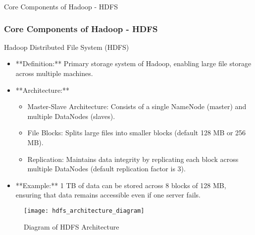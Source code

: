 \documentclass[aspectratio=169]{beamer}
\begin{document}
\begin{frame}[fragile]{Core Components of Hadoop - HDFS}
    \frametitle{Core Components of Hadoop - HDFS}
    \begin{block}{Hadoop Distributed File System (HDFS)}
        \begin{itemize}
            \item **Definition:** Primary storage system of Hadoop, enabling large file storage across multiple machines.
            \item **Architecture:**
                \begin{itemize}
                    \item Master-Slave Architecture: Consists of a single NameNode (master) and multiple DataNodes (slaves).
                    \item File Blocks: Splits large files into smaller blocks (default 128 MB or 256 MB).
                    \item Replication: Maintains data integrity by replicating each block across multiple DataNodes (default replication factor is 3).
                \end{itemize}
            \item **Example:** 1 TB of data can be stored across 8 blocks of 128 MB, ensuring that data remains accessible even if one server fails.
        \end{itemize}
    \end{block}
    \begin{figure}
        \centering
        \texttt{[image: hdfs\_architecture\_diagram]} %
        \caption{Diagram of HDFS Architecture}
    \end{figure}
\end{frame}
\end{document}
